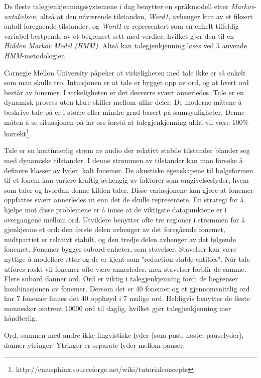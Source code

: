 De fleste talegjenkjenningssystemene i dag benytter en språkmodell etter \emph{Markov-antakelsen}, altså at den nåværende tilstanden, \emph{Word1}, avhenger kun av et fiksert antall foregående tilstander, og \emph{Word1} er representert som en enkelt tilfeldig variabel bestpende av et begrenset sett med verdier, hvilket gjør den til en \emph{Hidden Markov Model (HMM)}. Altså kan talegjenkjenning løses ved å anvende \emph{HMM}-metodologien.

Carnegie Mellon University påpeker at virkeligheten med tale ikke er så enkelt som man skulle tro. Intuisjonen er at tale er bygget opp av ord, og at hvert ord består av fonemer. I virkeligheten er det desverre svært annerledes. Tale er en dynamisk prosess uten klare skiller mellom ulike deler. De moderne måtene å beskrive tale på er i større eller mindre grad basert på sannsynligheter. Denne måten å se situasjonen på lar oss forstå at talegjenkjenning aldri vil være 100\% korrekt\footnote{http://cmusphinx.sourceforge.net/wiki/tutorialconcepts}.

Tale er en kontinuerlig strøm av audio der relativt stabile tilstander blander seg med dynamiske tilstander. I denne strømmen av tilstander kan man forsøke å definere klasser av lyder, kalt fonemer. De akustiske egenskapene til bølgeformen til et fonem kan variere kraftig avhengig av faktorer som omgivelseslyder, hvem som taler og hvordan denne kilden taler. Disse variasjonene kan gjøre at fonemer oppfattes svært annerledes ut enn det de skulle representere. 
En strategi for å hjelpe mot disse problemene er å innse at de viktigste datapunktene er i overgangene mellom ord. Utviklere benytter ofte tre regioner i strømmen for å gjenkjenne et ord: den første delen avhenger av det foregående fonemet, midtpartiet er relativt stabilt, og den tredje delen avhenger av det følgende fonemet. Fonemer bygger subord-enheter, som stavelser. Stavelser kan være nyttige å modellere etter og de er kjent som "reduction-stable entities". Når tale utføres raskt vil fonemer ofte være annerledes, men stavelser forblir de samme. Flere subord danner ord. Ord er viktig i talegjenkjenning fordi de begrenser kombinasjonen av fonemer. Dersom det er 40 fonemer og et gjennomsnittlig ord har 7 fonemer finnes det 40 opphøyd i 7 mulige ord. Heldigvis benytter de fleste mennesker omtrent 10000 ord til daglig, hvilket gjør talegjenkjenning mer håndterlig.

Ord, sammen med andre ikke-lingvistiske lyder (som pust, hoste, pauselyder), danner ytringer. Ytringer er separate lyder mellom pauser. 

